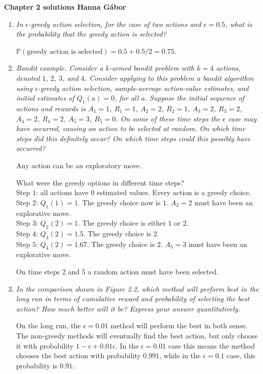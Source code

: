 \documentclass[12pt,a4paper]{article}
\begin{document}
\textbf{Chapter 2 solutions  \hfill Hanna Gábor}

\begin{enumerate}
  \item
    \textit{In $\epsilon$-greedy action selection, for the case of two actions and $\epsilon = 0.5$, what is the probability that the greedy action is selected?}

    $\mathbb{P}(\text{greedy action is selected}) = 0.5 + 0.5/2 = 0.75.$

  \item
    \textit{Bandit example. Consider a $k$-armed bandit problem with $k = 4$ actions, denoted $1$, $2$, $3$, and $4$. Consider applying to this problem a bandit algorithm using $\epsilon$-greedy action selection, sample-average action-value estimates, and initial estimates of $Q_1(a) = 0$, for all $a$. Suppose the initial sequence of actions and rewards is $A_1 = 1$, $R_1 = 1$, $A_2 = 2$, $R_2 = 1$, $A_3 = 2$, $R_3 = 2$, $A_4 = 2$,
    $R_4 = 2$, $A_5 = 3$, $R_5 = 0$. On some of these time steps the $\epsilon$ case may have occurred, causing an action to be selected at random. On which time steps did this definitely occur? On which time steps could this possibly have occurred?}

    Any action can be an exploratory move.

    What were the greedy options in different time steps?\\
    Step $1$: all actions have $0$ estimated values. Every action is a greedy choice.\\
    Step $2$: $Q_1(1) = 1$. The greedy choice now is $1$. $A_2 = 2$ must have been an\\ explorative move.\\
    Step $3$: $Q_2(2) = 1$. The greedy choice is either $1$ or $2$.\\
    Step $4$: $Q_3(2) = 1.5$. The greedy choice is $2$.\\
    Step $5$: $Q_4(2) = 1.67$. The greedy choice is $2$. $A_5 = 3$ must have been an explorative move.

    On time steps $2$ and $5$ a random action must have been selected.

 \item
    \textit{In the comparison shown in Figure 2.2, which method will perform best in
    the long run in terms of cumulative reward and probability of selecting the best action?
    How much better will it be? Express your answer quantitatively.}

    On the long run, the $\epsilon = 0.01$ method will perform the best in both sense.
    The non-greedy methods will eventually find the best action, but only choose it
    with probability $1 - \epsilon + 0.01 \epsilon $. In the $\epsilon = 0.01$ case this means the method
    chooses the best action with probability $0.991$, while in the $\epsilon = 0.1$ case,
    this probability is $0.91$.


\end{enumerate}
\end{document}
